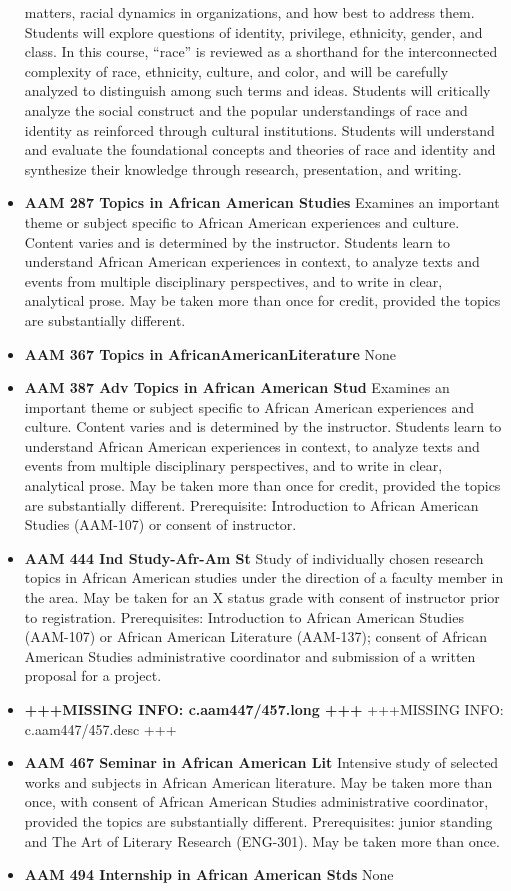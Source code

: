 \documentclass[
  letterpaper,
]{scrbook}
\begin{document}
\begin{itemize}
  matters, racial dynamics in organizations, and how best to address
  them. Students will explore questions of identity, privilege,
  ethnicity, gender, and class. In this course, ``race'' is reviewed as
  a shorthand for the interconnected complexity of race, ethnicity,
  culture, and color, and will be carefully analyzed to distinguish
  among such terms and ideas. Students will critically analyze the
  social construct and the popular understandings of race and identity
  as reinforced through cultural institutions. Students will understand
  and evaluate the foundational concepts and theories of race and
  identity and synthesize their knowledge through research,
  presentation, and writing.
\item
  \textbf{AAM 287 Topics in African American Studies} Examines an
  important theme or subject specific to African American experiences
  and culture. Content varies and is determined by the instructor.
  Students learn to understand African American experiences in context,
  to analyze texts and events from multiple disciplinary perspectives,
  and to write in clear, analytical prose. May be taken more than once
  for credit, provided the topics are substantially different.
\item
  \textbf{AAM 367 Topics in AfricanAmericanLiterature} None
\item
  \textbf{AAM 387 Adv Topics in African American Stud} Examines an
  important theme or subject specific to African American experiences
  and culture. Content varies and is determined by the instructor.
  Students learn to understand African American experiences in context,
  to analyze texts and events from multiple disciplinary perspectives,
  and to write in clear, analytical prose. May be taken more than once
  for credit, provided the topics are substantially different.
  Prerequisite: Introduction to African American Studies (AAM-107) or
  consent of instructor.
\item
  \textbf{AAM 444 Ind Study-Afr-Am St} Study of individually chosen
  research topics in African American studies under the direction of a
  faculty member in the area. May be taken for an X status grade with
  consent of instructor prior to registration. Prerequisites:
  Introduction to African American Studies (AAM-107) or African American
  Literature (AAM-137); consent of African American Studies
  administrative coordinator and submission of a written proposal for a
  project.
\item
  \textbf{+++MISSING INFO: c.aam447/457.long +++} +++MISSING INFO:
  c.aam447/457.desc +++
\item
  \textbf{AAM 467 Seminar in African American Lit} Intensive study of
  selected works and subjects in African American literature. May be
  taken more than once, with consent of African American Studies
  administrative coordinator, provided the topics are substantially
  different. Prerequisites: junior standing and The Art of Literary
  Research (ENG-301). May be taken more than once.
\item
  \textbf{AAM 494 Internship in African American Stds} None
\end{itemize}
\end{document}
